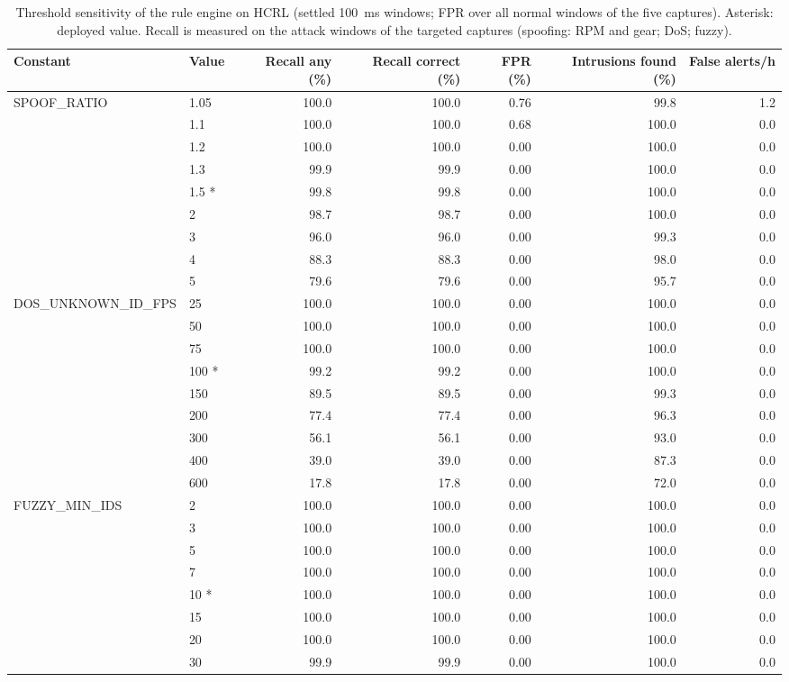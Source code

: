 \begin{table}[t]
\centering
\footnotesize
\caption{Threshold sensitivity of the rule engine on HCRL (settled 100~ms windows; FPR over all normal windows of the five captures). Asterisk: deployed value. Recall is measured on the attack windows of the targeted captures (spoofing: RPM and gear; DoS; fuzzy).}
\label{tab:hcrl_sensitivity}
\begin{tabular}{llrrrrr}
\toprule
Constant & Value & Recall any (\%) & Recall correct (\%) & FPR (\%) & Intrusions found (\%) & False alerts/h \\
\midrule
SPOOF\_RATIO & 1.05 & 100.0 & 100.0 & 0.76 & 99.8 & 1.2 \\
 & 1.1 & 100.0 & 100.0 & 0.68 & 100.0 & 0.0 \\
 & 1.2 & 100.0 & 100.0 & 0.00 & 100.0 & 0.0 \\
 & 1.3 & 99.9 & 99.9 & 0.00 & 100.0 & 0.0 \\
 & 1.5 * & 99.8 & 99.8 & 0.00 & 100.0 & 0.0 \\
 & 2 & 98.7 & 98.7 & 0.00 & 100.0 & 0.0 \\
 & 3 & 96.0 & 96.0 & 0.00 & 99.3 & 0.0 \\
 & 4 & 88.3 & 88.3 & 0.00 & 98.0 & 0.0 \\
 & 5 & 79.6 & 79.6 & 0.00 & 95.7 & 0.0 \\
\midrule
DOS\_UNKNOWN\_ID\_FPS & 25 & 100.0 & 100.0 & 0.00 & 100.0 & 0.0 \\
 & 50 & 100.0 & 100.0 & 0.00 & 100.0 & 0.0 \\
 & 75 & 100.0 & 100.0 & 0.00 & 100.0 & 0.0 \\
 & 100 * & 99.2 & 99.2 & 0.00 & 100.0 & 0.0 \\
 & 150 & 89.5 & 89.5 & 0.00 & 99.3 & 0.0 \\
 & 200 & 77.4 & 77.4 & 0.00 & 96.3 & 0.0 \\
 & 300 & 56.1 & 56.1 & 0.00 & 93.0 & 0.0 \\
 & 400 & 39.0 & 39.0 & 0.00 & 87.3 & 0.0 \\
 & 600 & 17.8 & 17.8 & 0.00 & 72.0 & 0.0 \\
\midrule
FUZZY\_MIN\_IDS & 2 & 100.0 & 100.0 & 0.00 & 100.0 & 0.0 \\
 & 3 & 100.0 & 100.0 & 0.00 & 100.0 & 0.0 \\
 & 5 & 100.0 & 100.0 & 0.00 & 100.0 & 0.0 \\
 & 7 & 100.0 & 100.0 & 0.00 & 100.0 & 0.0 \\
 & 10 * & 100.0 & 100.0 & 0.00 & 100.0 & 0.0 \\
 & 15 & 100.0 & 100.0 & 0.00 & 100.0 & 0.0 \\
 & 20 & 100.0 & 100.0 & 0.00 & 100.0 & 0.0 \\
 & 30 & 99.9 & 99.9 & 0.00 & 100.0 & 0.0 \\
\bottomrule
\end{tabular}
\end{table}
